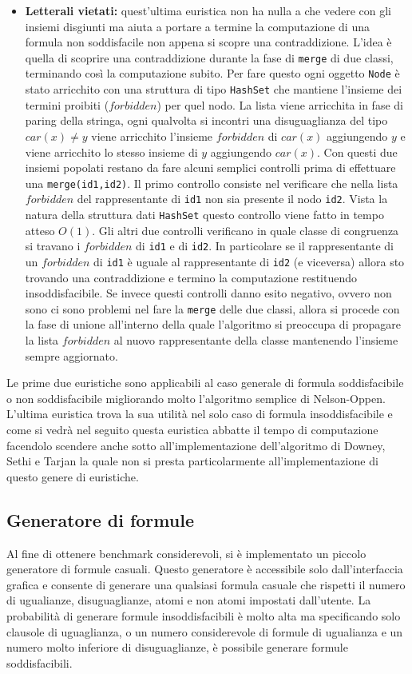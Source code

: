 \documentclass[a4paper,11pt]{article}
\begin{document}
\begin{itemize}
	\item {\bf Letterali vietati:} quest'ultima euristica non ha nulla a che vedere con gli insiemi disgiunti ma aiuta a portare a termine la computazione di una formula non soddisfacile non appena si scopre una contraddizione.
L'idea è quella di scoprire una contraddizione durante la fase di {\tt merge} di due classi, terminando così la computazione subito.
Per fare questo ogni oggetto {\tt Node} è stato arricchito con una struttura di tipo {\tt HashSet} che mantiene l'insieme dei termini proibiti ($forbidden$) per quel nodo.
La lista viene arricchita in fase di paring della stringa, ogni qualvolta si incontri una disuguaglianza del tipo $ car(x) \not= y$ viene arricchito l'insieme $forbidden$ di $car(x)$ aggiungendo $y$ e viene arricchito lo stesso insieme di $y$ aggiungendo $car(x)$.
Con questi due insiemi popolati restano da fare alcuni semplici controlli prima di effettuare una {\tt merge(id1,id2)}.
Il primo controllo consiste nel verificare che nella lista $forbidden$ del rappresentante di {\tt id1} non sia presente il nodo {\tt id2}.
Vista la natura della struttura dati {\tt HashSet} questo controllo viene fatto in tempo atteso $O(1)$.
Gli altri due controlli verificano in quale classe di congruenza si travano i $forbidden$ di {\tt id1} e di {\tt id2}.
In particolare se il rappresentante di un $forbidden$ di {\tt id1} è uguale al rappresentante di {\tt id2} (e viceversa) allora sto trovando una contraddizione e termino la computazione restituendo insoddisfacibile.
Se invece questi controlli danno esito negativo, ovvero non sono ci sono problemi nel fare la {\tt merge} delle due classi, allora si procede con la fase di unione all'interno della quale l'algoritmo si preoccupa di propagare la lista $forbidden$ al nuovo rappresentante della classe mantenendo l'insieme sempre aggiornato.
\end{itemize}
Le prime due euristiche sono applicabili al caso generale di formula soddisfacibile o non soddisfacibile migliorando molto l'algoritmo semplice di Nelson-Oppen.
L'ultima euristica trova la sua utilità nel solo caso di formula insoddisfacibile e come si vedrà nel seguito questa euristica abbatte il tempo di computazione facendolo scendere anche sotto all'implementazione dell'algoritmo di Downey, Sethi e Tarjan la quale non si presta particolarmente all'implementazione di questo genere di euristiche.
\subsection{Generatore di formule}
Al fine di ottenere benchmark considerevoli, si è implementato un piccolo generatore di formule casuali.
Questo generatore è accessibile solo dall'interfaccia grafica e consente di generare una qualsiasi formula casuale che rispetti il numero di ugualianze, disuguaglianze, atomi e non atomi impostati dall'utente.
La probabilità di generare formule insoddisfacibili è molto alta ma specificando solo clausole di uguaglianza, o un numero considerevole di formule di ugualianza e un numero molto inferiore di disuguaglianze, è possibile generare formule soddisfacibili.
\end{document}
